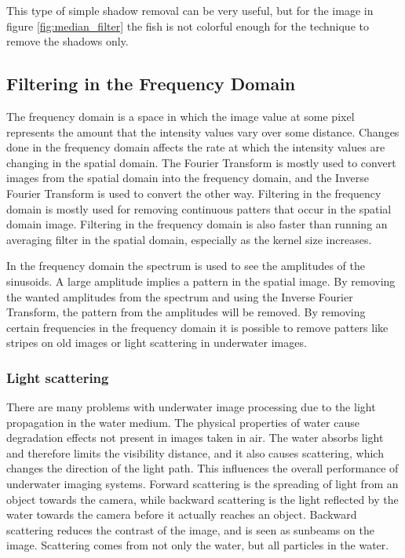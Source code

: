 This type of simple shadow removal can be very useful, but for the image in figure \ref{fig:median_filter} the fish is not colorful enough for the technique to remove the shadows only.


\subsection{Filtering in the Frequency Domain}

The frequency domain is a space in which the image value at some pixel represents the amount that the intensity values vary over some distance. Changes done in the frequency domain affects the rate at which the intensity values are changing in the spatial domain. 
The Fourier Transform is mostly used to convert images from the spatial domain into the frequency domain, and the Inverse Fourier Transform is used to convert the other way. 
Filtering in the frequency domain is mostly used for removing continuous patters that occur in the spatial domain image.
Filtering in the frequency domain is also faster than running an averaging filter in the spatial domain, especially as the kernel size increases. 

In the frequency domain the spectrum is used to see the amplitudes of the sinusoids. A large amplitude implies a pattern in the spatial image. By removing the wanted amplitudes from the spectrum and using the Inverse Fourier Transform, the pattern from the amplitudes will be removed.
By removing certain frequencies in the frequency domain it is possible to remove patters like stripes on old images or light scattering in underwater images.


\subsubsection{Light scattering}
There are many problems with underwater image processing due to the light propagation in the water medium. The physical properties of water cause degradation effects not present in images taken in air. The water absorbs light and therefore limits the visibility distance, and it also causes scattering, which changes the direction of the light path. This influences the overall performance of underwater imaging systems. Forward scattering is the spreading of light from an object towards the camera, while backward scattering is the light reflected by the water towards the camera before it actually reaches an object. Backward scattering reduces the contrast of the image, and is seen as sunbeams on the image. Scattering comes from not only the water, but all particles in the water. \cite{article:underwater_image_processing}

